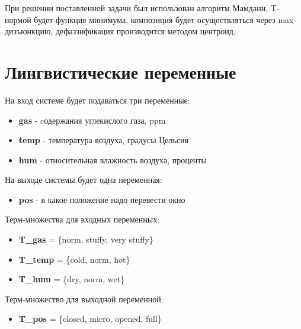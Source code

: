\documentclass[a4paper]{article}
\begin{document}
При решении поставленной задачи был использован алгоритм Мамдани,
T-нормой будет функция минимума, композиция будет осуществляться
через max-дизъюнкцию, дефаззификация производится методом центроид.

\newpage
\section{Лингвистические переменные}
На вход системе будет подаваться три переменные:
\begin{itemize}
    \item {\bfseries gas} - cодержания углекислого газа, ppm
    \item {\bfseries temp} - температура воздуха, градусы Цельсия
    \item {\bfseries hum} - относительная влажность воздуха, проценты
\end{itemize}

На выходе системы будет одна переменная:
\begin{itemize}
    \item {\bfseries pos} - в какое положение надо перевести окно 
\end{itemize}

Терм-множества для входных переменных:
\begin{itemize}
    \item {\bfseries T\_gas} = \{norm, stuffy, very stuffy\}
    \item {\bfseries T\_temp} = \{cold, norm, hot\}
    \item {\bfseries T\_hum} = \{dry, norm, wet\}
\end{itemize}

Терм-множество для выходной переменной:
\begin{itemize}
    \item {\bfseries T\_pos} = \{closed, micro, opened, full\} 
\end{itemize}

\end{document}
